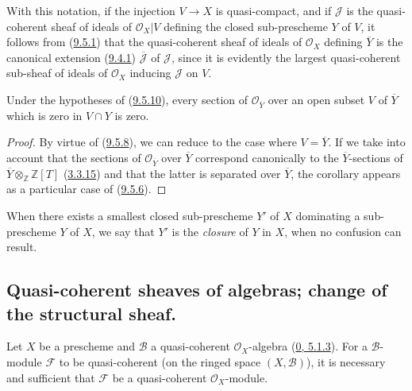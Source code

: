 With this notation, if the injection $V\to X$ is quasi-compact, and if
$\mathscr{J}$ is the quasi-coherent sheaf of ideals of
$\mathscr{O}_X|V$ defining the closed sub-prescheme $Y$ of $V$, it follows
from (\hyperref[I.9.5.1]{9.5.1}) that the quasi-coherent sheaf of ideals
of $\mathscr{O}_X$ defining $\overline{Y}$ is the canonical extension
(\hyperref[I.9.4.1]{9.4.1}) $\overline{\mathscr{J}}$ of $\mathscr{J}$,
since it is evidently the largest quasi-coherent sub-sheaf of ideals of
$\mathscr{O}_X$ inducing $\mathscr{J}$ on $V$.
\begin{corollary}[9.5.11]
\label{I.9.5.11}
Under the hypotheses of (\hyperref[I.9.5.10]{9.5.10}), every section of
$\mathscr{O}_{\overline{Y}}$ over an open subset $V$ of $\overline{Y}$
which is zero in $V\cap Y$ is zero.
\end{corollary}

\begin{proof}
By virtue of (\hyperref[I.9.5.8]{9.5.8}), we can reduce to the case where
$V=\overline{Y}$. If we take into account that the sections of
$\mathscr{O}_{\overline{Y}}$ over $\overline{Y}$ correspond
canonically to the $\overline{Y}$-sections of
$\overline{Y}\otimes_{\mathbb{Z}}\mathbb{Z}[T]$
(\hyperref[I.3.3.15]{3.3.15}) and that the latter is separated over
$\overline{Y}$, the corollary appears as a particular case of
(\hyperref[I.9.5.6]{9.5.6}).
\end{proof}

When there exists a smallest closed sub-prescheme $Y'$ of $X$
dominating a sub-prescheme $Y$ of $X$, we say that $Y'$ is the
\emph{closure} of $Y$ in $X$, when no confusion can result.

\subsection{Quasi-coherent sheaves of algebras; change of the structural
sheaf.}
\label{subsection:I.9.6}

\begin{proposition}[9.6.1]
\label{I.9.6.1}
Let $X$ be a prescheme and $\mathscr{B}$ a quasi-coherent
$\mathscr{O}_X$-algebra (\hyperref[0.5.1.3]{0, 5.1.3}). For a
$\mathscr{B}$-module $\mathscr{F}$ to be quasi-coherent (on the ringed
space $(X,\mathscr{B})$), it is necessary and sufficient that $\mathscr{F}$
be a quasi-coherent $\mathscr{O}_X$-module.
\end{proposition}

